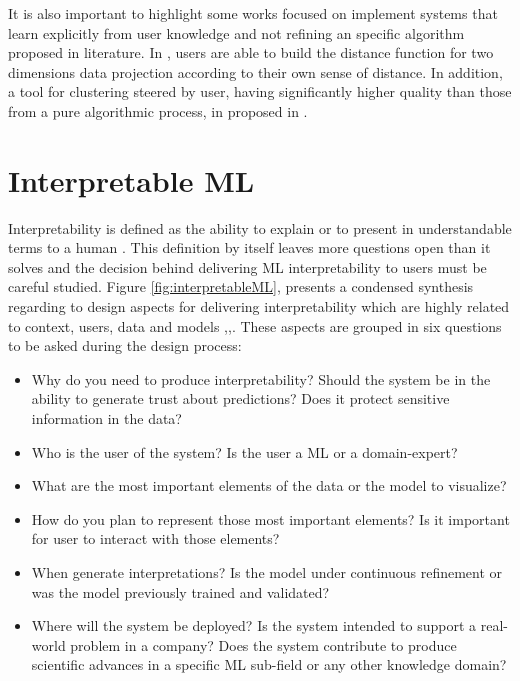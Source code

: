 It is also important to highlight some works focused on implement systems that learn explicitly from user knowledge and not refining an specific algorithm proposed in literature. In \cite{Brown2012}, users are able to build the distance function for two dimensions data projection according to their own sense of distance. In addition, a tool for clustering steered by user, having significantly higher quality than those from a pure algorithmic process, in proposed in \cite{Chang2016}.

\section{Interpretable ML} %
\label{section2.2}

Interpretability is defined as the ability to explain or to present in understandable terms to a human \cite{Doshi-Velez2017c}. This definition by itself leaves more questions open than it solves and the decision behind delivering ML interpretability to users must be careful studied. Figure \ref{fig:interpretableML}, presents a condensed synthesis regarding to design aspects for delivering interpretability which are highly related to context, users, data and models \cite{Hohman2018},\cite{Doshi-Velez2017c},\cite{Lipton2017}. These aspects are grouped in six questions to be asked during the design process:

\begin{itemize}
    \item Why do you need to produce interpretability? Should the system be in the ability to generate trust about predictions? Does it protect sensitive information in the data?
    \item Who is the user of the system? Is the user a ML or a domain-expert?
    \item What are the most important elements of the data or the model to visualize?
    \item How do you plan to represent those most important elements? Is it important for user to interact with those elements?
    \item When generate interpretations? Is the model under continuous refinement  or was the model previously trained and validated?
    \item Where will the system be deployed? Is the system intended to support a real-world problem in a company? Does the system contribute to produce scientific advances in a specific ML sub-field or any other knowledge domain?  
\end{itemize}

